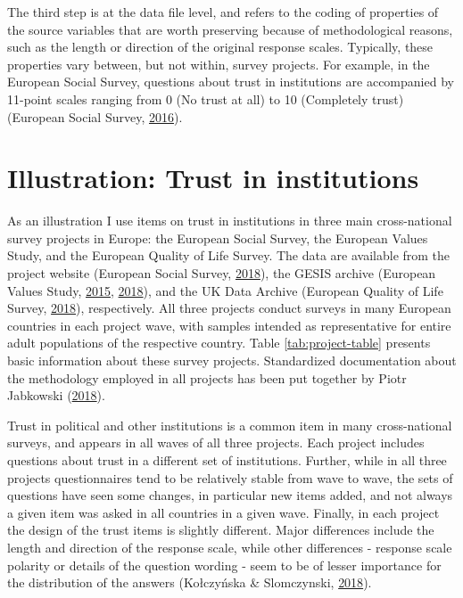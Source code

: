 \documentclass[12pt,]{article}
\begin{document}
The third step is at the data file level, and refers to the coding of properties of the source variables that are worth preserving because of methodological reasons, such as the length or direction of the original response scales. Typically, these properties vary between, but not within, survey projects. For example, in the European Social Survey, questions about trust in institutions are accompanied by 11-point scales ranging from 0 (No trust at all) to 10 (Completely trust) (European Social Survey, \protect\hyperlink{ref-ESS2016b}{2016}).

\hypertarget{illustration-trust-in-institutions}{%
\section{Illustration: Trust in institutions}\label{illustration-trust-in-institutions}}

As an illustration I use items on trust in institutions in three main cross-national survey projects in Europe: the European Social Survey, the European Values Study, and the European Quality of Life Survey. The data are available from the project website (European Social Survey, \protect\hyperlink{ref-ESS2018}{2018}), the GESIS archive (European Values Study, \protect\hyperlink{ref-EVS2015}{2015}, \protect\hyperlink{ref-EVS2018}{2018}), and the UK Data Archive (European Quality of Life Survey, \protect\hyperlink{ref-EQLS2018}{2018}), respectively. All three projects conduct surveys in many European countries in each project wave, with samples intended as representative for entire adult populations of the respective country. Table \ref{tab:project-table} presents basic information about these survey projects. Standardized documentation about the methodology employed in all projects has been put together by Piotr Jabkowski (\protect\hyperlink{ref-Jabkowski2018}{2018}).

Trust in political and other institutions is a common item in many cross-national surveys, and appears in all waves of all three projects. Each project includes questions about trust in a different set of institutions. Further, while in all three projects questionnaires tend to be relatively stable from wave to wave, the sets of questions have seen some changes, in particular new items added, and not always a given item was asked in all countries in a given wave. Finally, in each project the design of the trust items is slightly different. Major differences include the length and direction of the response scale, while other differences - response scale polarity or details of the question wording - seem to be of lesser importance for the distribution of the answers (Kołczyńska \& Slomczynski, \protect\hyperlink{ref-KolczynskaSlomczynski2018}{2018}).
\end{document}
